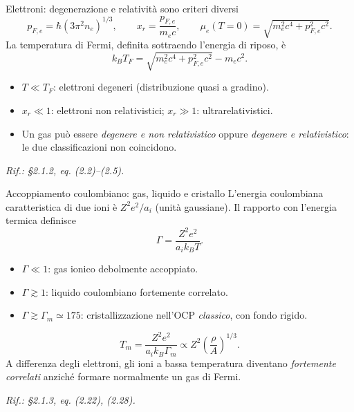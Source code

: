 \begin{frame}[t]{Elettroni: degenerazione e relatività sono criteri diversi}
\small
\[
 p_{F,e}=\hbar(3\pi^2 n_e)^{1/3},\qquad
 x_r=\frac{p_{F,e}}{m_ec},\qquad
 \mu_e(T=0)=\sqrt{m_e^2c^4+p_{F,e}^2c^2}.
\]
La temperatura di Fermi, definita sottraendo l'energia di riposo, è
\[
 k_BT_F=\sqrt{m_e^2c^4+p_{F,e}^2c^2}-m_ec^2.
\]
\begin{itemize}
\item $T\ll T_F$: elettroni degeneri (distribuzione quasi a gradino).
\item $x_r\ll1$: elettroni non relativistici; $x_r\gg1$: ultrarelativistici.
\item Un gas può essere \emph{degenere e non relativistico} oppure \emph{degenere e relativistico}: le due classificazioni non coincidono.
\end{itemize}
\par\scriptsize\emph{Rif.: §2.1.2, eq. (2.2)--(2.5).}
\end{frame}

\begin{frame}[t]{Accoppiamento coulombiano: gas, liquido e cristallo}
\small
L'energia coulombiana caratteristica di due ioni è $Z^2e^2/a_i$ (unità gaussiane). Il rapporto con l'energia termica definisce
\[
 \boxed{\Gamma=\frac{Z^2e^2}{a_i k_BT}}.
\]
\begin{itemize}
\item $\Gamma\ll1$: gas ionico debolmente accoppiato.
\item $\Gamma\gtrsim1$: liquido coulombiano fortemente correlato.
\item $\Gamma\gtrsim\Gamma_m\simeq175$: cristallizzazione nell'OCP \emph{classico}, con fondo rigido.
\end{itemize}
\[
 T_m=\frac{Z^2e^2}{a_i k_B\Gamma_m}\propto Z^2\left(\frac{\rho}{A}\right)^{1/3}.
\]
A differenza degli elettroni, gli ioni a bassa temperatura diventano \emph{fortemente correlati} anziché formare normalmente un gas di Fermi.
\par\scriptsize\emph{Rif.: §2.1.3, eq. (2.22), (2.28).}
\end{frame}

